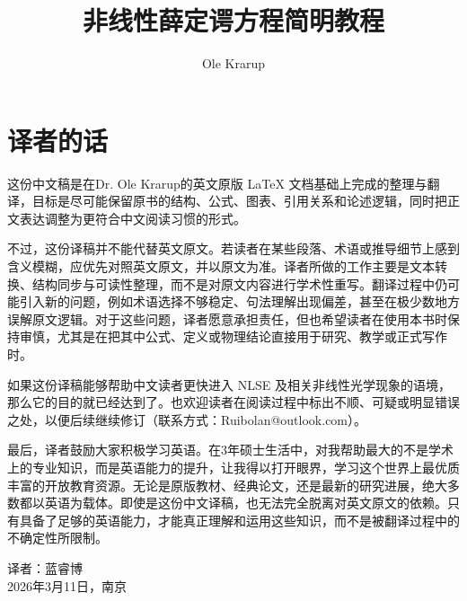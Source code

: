 \documentclass[
  UTF8,
  10pt,
  openany,
  punct=plain
]{ctexbook}
\author{Ole Krarup}
\title{\Large 非线性薛定谔方程简明教程}
\date{}
\begin{document}
\frontmatter

\maketitle
\addtocounter{page}{1}

\chapter*{译者的话}

这份中文稿是在Dr. Ole Krarup的英文原版 \LaTeX{} 文档基础上完成的整理与翻译，目标是尽可能保留原书的结构、公式、图表、引用关系和论述逻辑，同时把正文表达调整为更符合中文阅读习惯的形式。

不过，这份译稿并不能代替英文原文。若读者在某些段落、术语或推导细节上感到含义模糊，应优先对照英文原文，并以原文为准。译者所做的工作主要是文本转换、结构同步与可读性整理，而不是对原文内容进行学术性重写。翻译过程中仍可能引入新的问题，例如术语选择不够稳定、句法理解出现偏差，甚至在极少数地方误解原文逻辑。对于这些问题，译者愿意承担责任，但也希望读者在使用本书时保持审慎，尤其是在把其中公式、定义或物理结论直接用于研究、教学或正式写作时。

如果这份译稿能够帮助中文读者更快进入 NLSE 及相关非线性光学现象的语境，那么它的目的就已经达到了。也欢迎读者在阅读过程中标出不顺、可疑或明显错误之处，以便后续继续修订（联系方式：Ruibolan@outlook.com）。

最后，译者鼓励大家积极学习英语。在3年硕士生活中，对我帮助最大的不是学术上的专业知识，而是英语能力的提升，让我得以打开眼界，学习这个世界上最优质丰富的开放教育资源。无论是原版教材、经典论文，还是最新的研究进展，绝大多数都以英语为载体。即使是这份中文译稿，也无法完全脱离对英文原文的依赖。只有具备了足够的英语能力，才能真正理解和运用这些知识，而不是被翻译过程中的不确定性所限制。

\begin{flushright}
译者：蓝睿博\\
2026年3月11日，南京
\end{flushright}

\tableofcontents

\listoffigures
\listoftables

%

\mainmatter

\pagestyle{plain}











\backmatter


\end{document}
